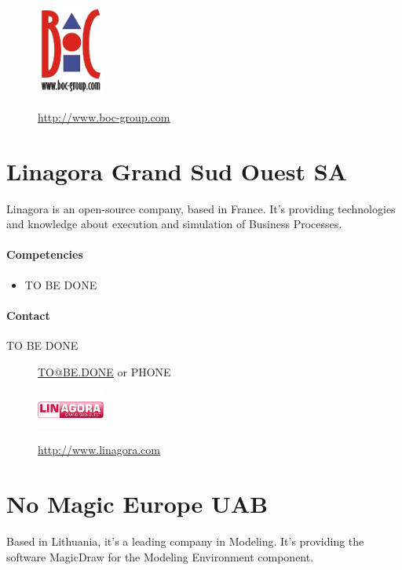 \documentclass{learnpad}
\begin{document}
\begin{figure}[!htp]
	\centering
	\includegraphics[width=6em,keepaspectratio]{figures/boc-group.png}\par
	\url{http://www.boc-group.com}
\end{figure}

\section{Linagora Grand Sud Ouest SA}
Linagora is an open-source company, based in France.  It's providing
technologies and knowledge about execution and simulation of Business Processes.

\paragraph{Competencies}
\begin{itemize}
	\item TO BE DONE
\end{itemize}

\paragraph{Contact}
\begin{description}
	\item[TO BE DONE] \href{mailto:TO@BE.DONE}{TO@BE.DONE} or PHONE
\end{description}

\begin{figure}[!htp]
	\centering
	\includegraphics[width=6em,keepaspectratio]{figures/linagora.png}\par
	\url{http://www.linagora.com}
\end{figure}

\section{No Magic Europe UAB}
Based in Lithuania, it's a leading company in Modeling.  It's providing the
software MagicDraw for the Modeling Environment component.
\end{document}
